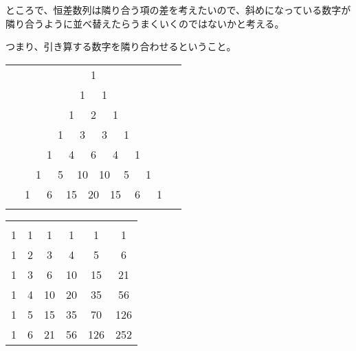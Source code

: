 \documentclass[dvipdfmx,12pt]{beamer}
\begin{document}
\begin{frame}
\frametitle{}
ところで、恒差数列は隣り合う項の差を考えたいので、斜めになっている数字が隣り合うように並べ替えたらうまくいくのではないかと考える。

つまり、引き算する数字を隣り合わせるということ。
\begin{multicols}{2}
\begin{table}
\begin{center}
\begin{tabular}{cccccccccccccccc}
\multicolumn{7}{c}{}&\multicolumn{2}{c}{1}&\multicolumn{7}{c}{}\\
\multicolumn{6}{c}{}&\multicolumn{2}{c}{1}&\multicolumn{2}{c}{1}&\multicolumn{6}{c}{}\\
\multicolumn{5}{c}{}&\multicolumn{2}{c}{1}&\multicolumn{2}{c}{2}&\multicolumn{2}{c}{1}&\multicolumn{5}{c}{}\\
\multicolumn{4}{c}{}&\multicolumn{2}{c}{1}&\multicolumn{2}{c}{3}&\multicolumn{2}{c}{3}&\multicolumn{2}{c}{1}&\multicolumn{4}{c}{}\\
\multicolumn{3}{c}{}&\multicolumn{2}{c}{1}&\multicolumn{2}{c}{4}&\multicolumn{2}{c}{6}&\multicolumn{2}{c}{4}&\multicolumn{2}{c}{1}&\multicolumn{3}{c}{}\\
\multicolumn{2}{c}{}&\multicolumn{2}{c}{1}&\multicolumn{2}{c}{5}&\multicolumn{2}{c}{10}&\multicolumn{2}{c}{10}&\multicolumn{2}{c}{5}&\multicolumn{2}{c}{1}&\multicolumn{2}{c}{}\\
&\multicolumn{2}{c}{1}&\multicolumn{2}{c}{6}&\multicolumn{2}{c}{15}&\multicolumn{2}{c}{20}&\multicolumn{2}{c}{15}&\multicolumn{2}{c}{6}&\multicolumn{2}{c}{1}&\\
&&&&&&&&&&&&&&&
\end{tabular}
\end{center}
\end{table}


\begin{table}[b]
\begin{center}
\begin{tabular}{cccccc}
&&&&&\\
1&1&1&1&1&1\\
1&2&3&4&5&6\\
1&3&6&10&15&21\\
1&4&10&20&35&56\\
1&5&15&35&70&126\\
1&6&21&56&126&252
\end{tabular}
\end{center}
\end{table}
\end{multicols}

\end{frame}
\end{document}
